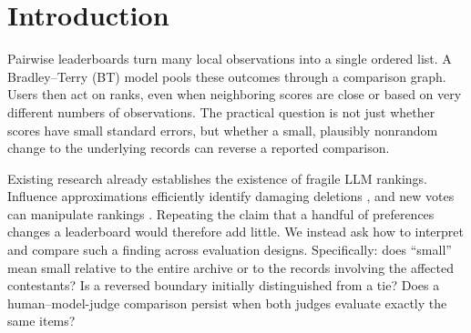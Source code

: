 \documentclass{article}
\begin{document}
\printAffiliationsAndNotice{}

\begin{abstract}
A small fraction of a leaderboard's records can be a substantial fraction of the evidence about a particular rank boundary. We audit Bradley--Terry rankings across crowdsourced preferences, expert judgments, a model judge, and scheduled basketball games, using refitted deletion and outcome-reversal witnesses. The Arena leader changes after two deletions, compared with 92 for MT-Bench human judgments and four to nine for three NBA seasons, but exposure normalization makes the sports and expert leader comparisons much closer. Most adjacent boundaries are not separated by bootstrap uncertainty; nevertheless, an Arena boundary with a positive simultaneous lower bound reverses after deleting \ArenaSeparatedAlpha{}\% of all records. On identical MT-Bench comparison units, GPT-4 judgments need more edits than human judgments to reverse the leading pair, with positive paired bootstrap intervals for the difference. These are feasible attacks rather than minimum-edit certificates: the evidence supports reporting exposure, uncertainty, and the edit mechanism together, and does not identify a causal ranking of evaluation designs.
\end{abstract}

\section{Introduction}
Pairwise leaderboards turn many local observations into a single ordered list. A Bradley--Terry (BT) model pools these outcomes through a comparison graph. Users then act on ranks, even when neighboring scores are close or based on very different numbers of observations. The practical question is not just whether scores have small standard errors, but whether a small, plausibly nonrandom change to the underlying records can reverse a reported comparison.

Existing research already establishes the existence of fragile LLM rankings. Influence approximations efficiently identify damaging deletions \citep{broderick2020,huang2025}, and new votes can manipulate rankings \citep{min2025}. Repeating the claim that a handful of preferences changes a leaderboard would therefore add little. We instead ask how to interpret and compare such a finding across evaluation designs. Specifically: does ``small'' mean small relative to the entire archive or to the records involving the affected contestants? Is a reversed boundary initially distinguished from a tie? Does a human--model-judge comparison persist when both judges evaluate exactly the same items?
\end{document}

